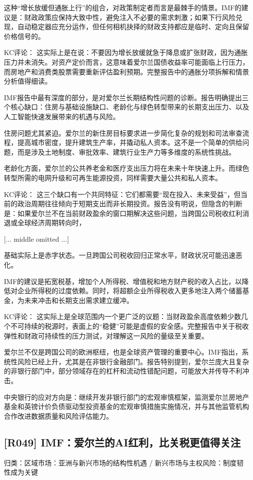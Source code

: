 \documentclass[11pt]{ctexart}
\begin{document}
这种“增长放缓但通胀上行”的组合，对政策制定者而言是最棘手的情景。IMF的建议是：财政政策应保持大致中性，避免注入不必要的需求刺激；如果下行风险兑现，自动稳定器应充分运作，但任何相机抉择的财政支持都应是临时、定向且保留价格信号的。

KC评论： 这实际上是在说：不要因为增长放缓就急于降息或扩张财政，因为通胀压力并未消失。对资产定价而言，这意味着爱尔兰国债收益率可能面临上行压力，而房地产和消费类股票需要重新评估盈利预期。完整报告中的通胀分项拆解和情景分析值得细读。

IMF报告中最有深度的部分，是对爱尔兰长期结构性问题的诊断。报告明确提出三个核心缺口：住房与基础设施缺口、老龄化与绿色转型带来的长期支出压力、以及人工智能快速发展带来的机遇与风险。

住房问题尤其紧迫。爱尔兰的新住房目标要求进一步简化复杂的规划和司法审查流程，提高城市密度，提升建筑生产率，并撬动私人资本。这不是一个简单的供给问题，而是涉及土地制度、审批效率、建筑行业生产力等多维度的系统性挑战。

老龄化方面，爱尔兰的公共养老金和医疗支出压力将在未来十年快速上升。而绿色转型所需的电网升级和可再生能源投资，同样需要大量公共和私人资本。

KC评论： 这三个缺口有一个共同特征：它们都需要“现在投入、未来受益”，但当前的政治周期往往倾向于短期支出而非长期投资。报告没有明说，但隐含的判断是：如果爱尔兰不在当前财政盈余的窗口期解决这些问题，当跨国公司税收红利消退或全球经济周期转向时，

[... middle omitted ...]

基础实际上是赤字状态。一旦跨国公司税收回归正常水平，财政状况可能迅速恶化。

IMF的建议是拓宽税基，增加个人所得税、增值税和地方财产税的收入占比，以降低对企业所得税的过度依赖。同时，将超额企业所得税收入更多地注入两个储蓄基金，为未来冲击和长期支出需求建立缓冲。

KC评论： 这实际上是全球范围内一个更广泛的议题：当财政盈余高度依赖少数几个不可持续的税源时，表面上的“稳健”可能是虚假的安全感。完整报告中关于税收弹性和财政可持续性的压力测试，对理解这一风险的量级至关重要。

爱尔兰不仅是跨国公司的欧洲枢纽，也是全球资产管理的重要中心。IMF指出，系统性风险已经上升，尤其是在非银行金融部门。报告特别提到，爱尔兰庞大且复杂的非银行部门中，部分领域存在的杠杆和流动性错配问题，可能放大并传导不利冲击。

中央银行的应对方向是：继续开发非银行部门的宏观审慎框架，监测爱尔兰房地产基金和英镑计价负债驱动型投资基金的宏观审慎措施实施情况，并与其他监管机构合作改进数据质量和风险评估能力。

\subsection{[R049] IMF：爱尔兰的AI红利，比关税更值得关注}
{\small\color{refgray}归类：区域市场：亚洲与新兴市场的结构性机遇 / 新兴市场与主权风险：制度韧性成为关键}
\end{document}

